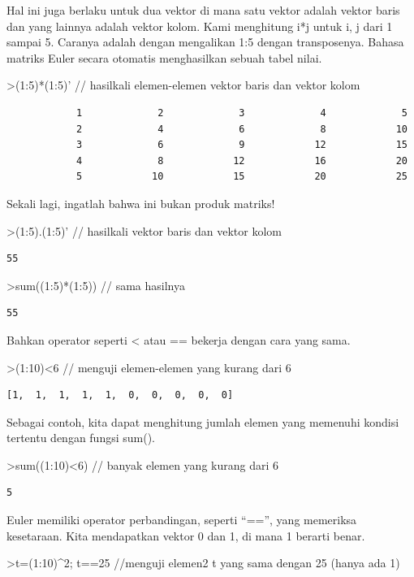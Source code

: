 \documentclass[
]{book}
\begin{document}
Hal ini juga berlaku untuk dua vektor di mana satu vektor adalah vektor baris dan yang lainnya adalah vektor kolom. Kami menghitung i*j untuk i, j dari 1 sampai 5. Caranya adalah dengan mengalikan 1:5 dengan transposenya. Bahasa matriks Euler secara otomatis menghasilkan sebuah tabel nilai.

\textgreater(1:5)*(1:5)' // hasilkali elemen-elemen vektor baris dan vektor kolom

\begin{verbatim}
            1             2             3             4             5 
            2             4             6             8            10 
            3             6             9            12            15 
            4             8            12            16            20 
            5            10            15            20            25 
\end{verbatim}

Sekali lagi, ingatlah bahwa ini bukan produk matriks!

\textgreater(1:5).(1:5)' // hasilkali vektor baris dan vektor kolom

\begin{verbatim}
55
\end{verbatim}

\textgreater sum((1:5)*(1:5)) // sama hasilnya

\begin{verbatim}
55
\end{verbatim}

Bahkan operator seperti \textless{} atau == bekerja dengan cara yang sama.

\textgreater(1:10)\textless6 // menguji elemen-elemen yang kurang dari 6

\begin{verbatim}
[1,  1,  1,  1,  1,  0,  0,  0,  0,  0]
\end{verbatim}

Sebagai contoh, kita dapat menghitung jumlah elemen yang memenuhi kondisi tertentu dengan fungsi sum().

\textgreater sum((1:10)\textless6) // banyak elemen yang kurang dari 6

\begin{verbatim}
5
\end{verbatim}

Euler memiliki operator perbandingan, seperti ``=='', yang memeriksa kesetaraan. Kita mendapatkan vektor 0 dan 1, di mana 1 berarti benar.

\textgreater t=(1:10)\^{}2; t==25 //menguji elemen2 t yang sama dengan 25 (hanya ada 1)
\end{document}
